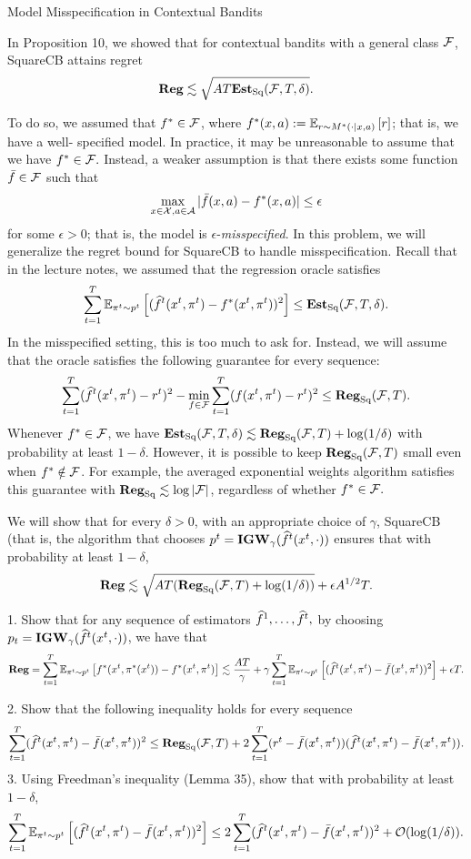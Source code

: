 \begin{exercise}[]{Model Misspecification in Contextual Bandits}
\end{exercise}
In Proposition 10, we showed that for contextual bandits with a general class $\F$,
 SquareCB attains regret
 \[ \Reg \lesssim \sqrt{AT \EstSq(\F,T,\delta)}.\]

 To do so, we assumed that $f^* \in \F$, where 
 $f^*(x,a) := \EEs{r}{r\sim M^*(\cdot|x,a)}$; that is, we have a well- specified model. 
 In practice, it may be unreasonable to assume that we have $f^* \in \F.$
 Instead, a weaker assumption is that there exists some function $\bar f \in \F$ such that
 \[ \max_{x \in \X, a \in \A} |\bar f(x,a)-f^*(x,a)|\leq \epsilon\]
 for some $\epsilon >0$; that is, the model is $\epsilon$-\textit{misspecified}. In this problem,
 we will generalize the regret bound for SquareCB to handle misspecification. Recall that in the lecture notes, we assumed
 that the regression oracle satisfies
 \[ \sum_{t=1}^T \EEs{(\wh f^t(x^t,\pi^t)-f^*(x^t,\pi^t))^2}{\pi^t \sim p^t}\leq \EstSq(\F,T,\delta).\]
 In the misspecified setting, this is too much to ask for. 
 Instead, we will assume that the oracle satisfies the following guarantee for every sequence:
\[ \sum_{t=1}^T(\wh f^t(x^t,\pi^t)-r^t)^2 -\min_{f\in \F}\sum_{t=1}^T(f(x^t,\pi^t)-r^t)^2\leq \Reg_{\text{Sq}}(\F,T).\]
Whenever $f^* \in \F$, we have $\EstSq(\F,T,\delta)\lesssim \Reg_{\text{Sq}}(\F,T)+ \log(1/\delta)$ with probability at least $1-\delta$.
However, it is possible to keep $\Reg_{\text{Sq}}(\F,T)$ small even when $f^* \notin \F$.
For example, the averaged exponential weights algorithm satisfies this guarantee with 
$\Reg_{\text{Sq}} \lesssim \log |\F|$, regardless of whether $f^* \in \F.$

We will show that for every $\delta > 0$, with an appropriate choice of $\gamma$, SquareCB (that is, the algorithm that chooses $p^t =\textbf{IGW}_\gamma(\wh f^t(x^t,\cdot))$ 
ensures that with probability at least $1-\delta$,
\[ \Reg \lesssim \sqrt{AT (\Reg_{\text{Sq}}(\F,T)+\log(1/\delta))} +\epsilon A^{1/2}T.\]

1.  Show that for any sequence of estimators 
$\wh f^1 ,\ldots,\wh f^t,$ by choosing $p_t = \textbf{IGW}_\gamma(\wh f^t(x^t , \cdot))$, we have that
\[\Reg= \sum_{t=1}^T \EEs{f^*(x^t,\pi^*(x^t))-f^*(x^t,\pi^t)}{\pi^t\sim p^t} \lesssim \frac{AT}{\gamma}+ \gamma \sum_{t=1}^T
\EEs{(\wh f^t(x^t,\pi^t)-\bar f(x^t,\pi^t))^2}{\pi^t \sim p^t}+\epsilon T.\]

2. Show that the following inequality holds for every sequence
\[ \sum_{t=1}^T(\wh f^t(x^t,\pi^t)-\bar f(x^t,\pi^t))^2\leq \Reg_{\text{Sq}}(\F,T)+2\sum_{t=1}^T(r^t-\bar f(x^t,\pi^t))(\wh f^t(x^t,\pi^t)-\bar f(x^t,\pi^t)).\]
3. Using Freedman’s inequality (Lemma 35), show that with probability at least $1-\delta$,
\[\sum_{t=1}^T \EEs{(\wh f^t (x^t,\pi^t)-\bar f(x^t,\pi^t))^2}{\pi^t \sim p^t} \leq 2\sum_{t=1}^T(\wh f^t (x^t, \pi^t)-\bar f (x^t,\pi^t))^2 + \OO(\log(1/\delta)).\]

